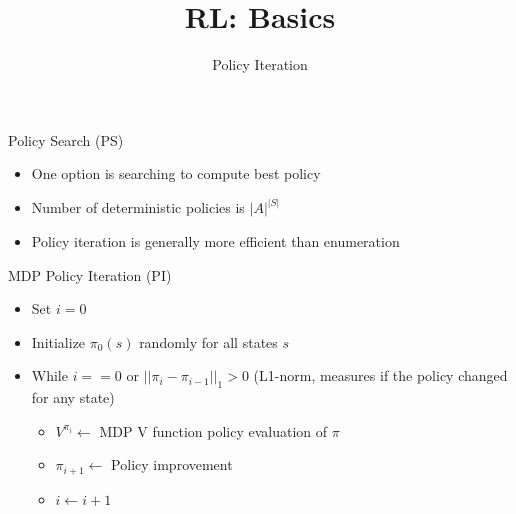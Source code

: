 


\title[Reinforcement Learning: Basics]{RL: Basics}
\subtitle{Policy Iteration}




	
	\maketitle

\begin{frame}[c]{Policy Search (PS)}

\begin{itemize}
	\item One option is searching to compute best policy
	\item Number of deterministic policies is $|A|^{|S|}$
	\item Policy iteration is generally more efficient than enumeration
\end{itemize}

\end{frame}
\begin{frame}[c]{MDP Policy Iteration (PI)}

\begin{itemize}
	\item Set $i=0$
	\item Initialize $\pi_0(s)$ randomly for all states $s$
	\item While $i == 0$ or $||\pi_i - \pi_{i-1}||_1 > 0$ (L1-norm, measures if the policy changed for any state)
	\begin{itemize}
		\item $V^{\pi_i} \gets$ MDP V function policy evaluation of $\pi$
		\item $\pi_{i+1} \gets$ Policy improvement
		\item $i \gets i+1$
	\end{itemize}
\end{itemize}

\end{frame}
